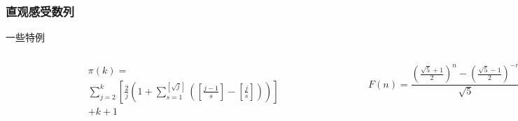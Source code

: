 \documentclass[
10pt, 
aspectratio=43, 
]{beamer}
\begin{document}
\subsubsection{直观感受数列}
\begin{frame}{一些特例}
	\begin{columns}
		\begin{figure}
			\centering
			\includegraphics[width=0.8\linewidth]{prime.png}
			
		\end{figure}
		\begin{equation*}
			\begin{aligned}
				  & \pi(k)=                                                                                                                                    \\
				  & \sum_{j=2}^k\left[\frac{2}{j}\left(1+\sum_{s=1}^{[\sqrt{j}]}\left(\left[\frac{j-1}{s}\right]-\left[\frac{j}{s}\right]\right)\right)\right] \\
				  & +k+1                                                                                                                                       
			\end{aligned}
		\end{equation*}
		\small
		\begin{figure}
			\centering
			\includegraphics[width=0.8\linewidth]{fibonacci.png}
		\end{figure}
		\begin{equation*}
			F(n) = \frac{{(\frac{\sqrt{5}+1}{2})^n - (\frac{\sqrt{5}-1}{2})^{-n}}}{{\sqrt{5}}}.
		\end{equation*}
	\end{columns}
\end{frame}
\end{document}
